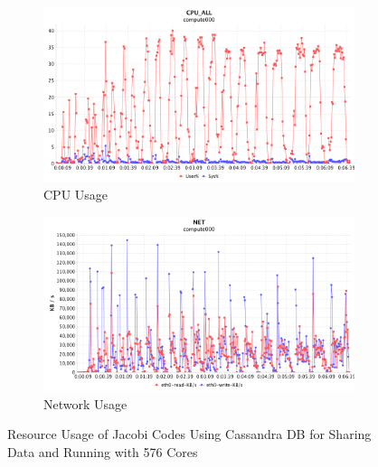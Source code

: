 \begin{figure}[!ht]
\centering
\begin{subfigure}{1\textwidth}
  \centering
  \includegraphics[width=1\linewidth]{figures/JacobiDB131_576_CPU.png}
  \caption{CPU Usage}
  \label{JacobiDB131_576_CPU}
\end{subfigure}
\begin{subfigure}{1\textwidth}
  \centering
  \includegraphics[width=1\linewidth]{figures/JacobiDB131_576_NET.png}
  \caption{Network Usage}
  \label{JacobiDB131_576_NET}
\end{subfigure}
\caption{Resource Usage of Jacobi Codes Using Cassandra DB for Sharing Data and Running with 576 Cores}
\label{JacobiDB131_576}
\end{figure}

